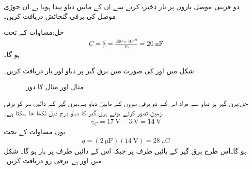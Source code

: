 
دو  قریبی موصل تاروں پر  بار ذخیرہ کرنے سے ان کے مابین  دباو پیدا ہوتا ہے۔ان جوڑی موصل کی برقی گنجائش دریافت کریں۔

حل:مساوات  کے تحت
\begin{align*}
C=\frac{q}{v}=\frac{300 \times 10^{-9}}{15}=\SI{20}{\nano\farad}
\end{align*}
ہو گا۔ 

\FloatBarrier
شکل  میں  اور  کی صورت میں برق گیر پر دباو اور بار دریافت کریں۔
\begin{figure}
\centering
{}
\caption{مثال  اور مثال  کا دور۔}
\label{شکل_مثال_امالہ_برق_گیر_دباو_رو_تعلق_الف}
\end{figure}

حل:برق گیر پر دباو سے مراد اس کے دو برقی سروں کے مابین دباو ہے۔برق گیر کے دائیں سر کو برقی زمین تصور کرتے ہوئے  برق گیر کا دباو درج ذیل لکھا جا سکتا ہے۔
\begin{align*}
v_C=\SI{17}{\volt}-\SI{3}{\volt}=\SI{14}{\volt}
\end{align*}
یوں مساوات  کے تحت
\begin{align*}
q=\left(\SI{2}{\micro\farad}\right)\left(\SI{14}{\volt}\right)=\SI{28}{\micro\coulomb}
\end{align*}
ہو گا۔اس طرح برق گیر کے بائیں طرف پر  جبکہ اس کے دائیں طرف پر  بار ہو گا۔
شکل  میں  اور  ہے۔برقی رو دریافت کریں۔

